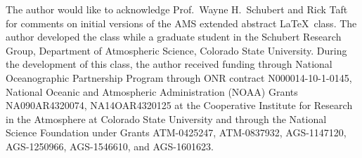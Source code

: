 \documentclass[9pt]{ametsocextabs}
\begin{document}
%
\acknowledgments
The author would like to acknowledge Prof.\ Wayne H.\ Schubert and
Rick Taft for comments on initial versions of the AMS extended
abstract \LaTeX\ class. The author developed the class while a
graduate student in the Schubert Research Group,
Department of Atmospheric Science, Colorado State University. During
the development of this class, the author received funding through
National Oceanographic Partnership Program through ONR contract
N000014-10-1-0145, National Oceanic and Atmospheric Administration
(NOAA) Grants NA090AR4320074, NA14OAR4320125 at the Cooperative
Institute for Research in the Atmosphere at Colorado State
University and through the National Science Foundation under Grants
ATM-0425247, ATM-0837932, AGS-1147120, AGS-1250966, AGS-1546610, and
AGS-1601623.



\end{document}

